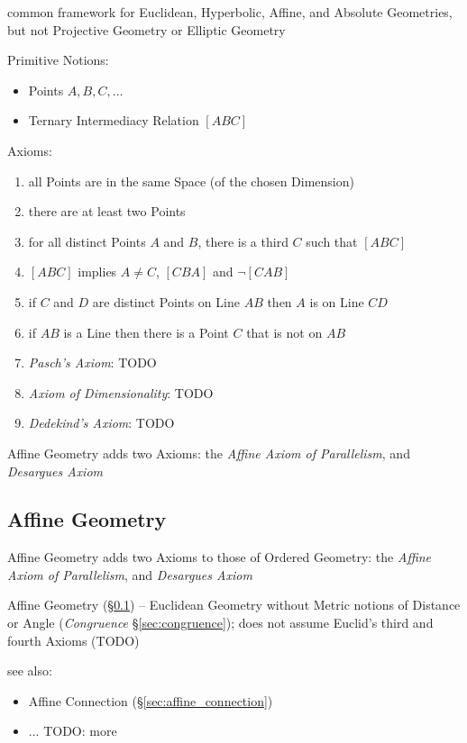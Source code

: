 common framework for Euclidean, Hyperbolic, Affine, and Absolute Geometries, but
not Projective Geometry or Elliptic Geometry

Primitive Notions:
\begin{itemize}
  \item Points $A, B, C, \ldots$
  \item Ternary Intermediacy Relation $[ABC]$
\end{itemize}

Axioms:
\begin{enumerate}
  \item all Points are in the same Space (of the chosen Dimension)
  \item there are at least two Points
  \item for all distinct Points $A$ and $B$, there is a third $C$ such that
    $[ABC]$
  \item $[ABC]$ implies $A \neq C$, $[CBA]$ and $\neg[CAB]$
  \item if $C$ and $D$ are distinct Points on Line $AB$ then $A$ is on Line $CD$
  \item if $AB$ is a Line then there is a Point $C$ that is not on $AB$
  \item \emph{Pasch's Axiom}: TODO
  \item \emph{Axiom of Dimensionality}: TODO
  \item \emph{Dedekind's Axiom}: TODO
\end{enumerate}

Affine Geometry adds two Axioms: the \emph{Affine Axiom of Parallelism}, and
\emph{Desargues Axiom}



\subsection{Affine Geometry}\label{sec:affine_geometry}

Affine Geometry adds two Axioms to those of Ordered Geometry: the \emph{Affine
  Axiom of Parallelism}, and \emph{Desargues Axiom}

Affine Geometry (\S\ref{sec:affine_geometry}) -- Euclidean Geometry without
Metric notions of Distance or Angle (\emph{Congruence} \S\ref{sec:congruence});
does not assume Euclid's third and fourth Axioms (TODO)

see also:
\begin{itemize}
  \item Affine Connection (\S\ref{sec:affine_connection})
  \item ... TODO: more
\end{itemize}



